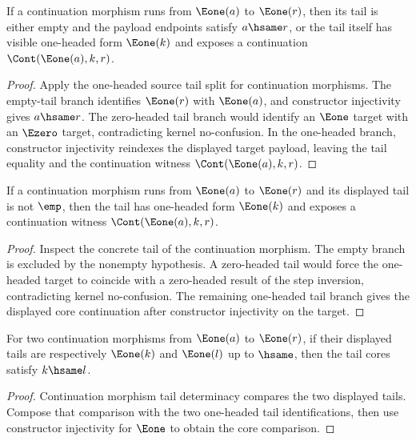 \begin{theorem}
\label{thm:category-continuation-morphism-e1-source-e1-target-tail-cases}
If a continuation morphism runs from $\Eone(a)$ to $\Eone(r)$, then its tail is
either empty and the payload endpoints satisfy $a\hsame r$, or the tail itself
has visible one-headed form $\Eone(k)$ and exposes a continuation
$\Cont(\Eone(a),k,r)$.
\end{theorem}
\begin{proof}
Apply the one-headed source tail split for continuation morphisms. The
empty-tail branch identifies $\Eone(r)$ with $\Eone(a)$, and constructor
injectivity gives $a\hsame r$. The zero-headed tail branch would identify an
$\Eone$ target with an $\Ezero$ target, contradicting kernel no-confusion. In
the one-headed branch, constructor injectivity reindexes the displayed target
payload, leaving the tail equality and the continuation witness
$\Cont(\Eone(a),k,r)$.
\end{proof}

\begin{theorem}
\label{thm:category-continuation-morphism-e1-source-e1-target-nonempty-tail-cases}
If a continuation morphism runs from $\Eone(a)$ to $\Eone(r)$ and its displayed
tail is not $\emp$, then the tail has one-headed form $\Eone(k)$ and exposes a
continuation witness $\Cont(\Eone(a),k,r)$.
\end{theorem}
\begin{proof}
Inspect the concrete tail of the continuation morphism. The empty branch is
excluded by the nonempty hypothesis. A zero-headed tail would force the
one-headed target to coincide with a zero-headed result of the step inversion,
contradicting kernel no-confusion. The remaining one-headed tail branch gives
the displayed core continuation after constructor injectivity on the target.
\end{proof}

\begin{theorem}
\label{thm:category-continuation-morphism-e1-source-e1-target-tail-core-deterministic}
For two continuation morphisms from $\Eone(a)$ to $\Eone(r)$, if their displayed
tails are respectively $\Eone(k)$ and $\Eone(l)$ up to $\hsame$, then the tail
cores satisfy $k\hsame l$.
\end{theorem}
\begin{proof}
Continuation morphism tail determinacy compares the two displayed tails. Compose
that comparison with the two one-headed tail identifications, then use
constructor injectivity for $\Eone$ to obtain the core comparison.
\end{proof}

